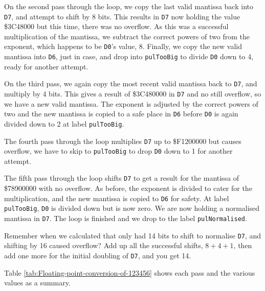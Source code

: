 On the second pass through the loop, we copy the last valid mantissa
back into \texttt{D7}, and attempt to shift by 8 bits. This results
in \texttt{D7} now holding the value \$3C48000 but this time, there
was no overflow. As this was a successful multiplication of the mantissa,
we subtract the correct powers of two from the exponent, which happens
to be \texttt{D0}'s value, 8. Finally, we copy the new valid mantissa
into \texttt{D6}, just in case, and drop into \texttt{pulTooBig} to
divide \texttt{D0} down to 4, ready for another attempt.

On the third pass, we again copy the most recent valid mantissa back
to \texttt{D7}, and multiply by 4 bits. This gives a result of \$3C480000
in \texttt{D7} and no still overflow, so we have a new valid mantissa.
The exponent is adjusted by the correct powers of two and the new
mantissa is copied to a safe place in \texttt{D6} before \texttt{D0}
is again divided down to 2 at label \texttt{pulTooBig}.

The fourth pass through the loop multiplies \texttt{D7} up to \$F1200000
but causes overflow, we have to skip to \texttt{pulTooBig} to drop
\texttt{D0} down to 1 for another attempt.

The fifth pass through the loop shifts \texttt{D7} to get a result
for the mantissa of \$78900000 with no overflow. As before, the exponent
is divided to cater for the multiplication, and the new mantissa is
copied to \texttt{D6} for safety. At label \texttt{pulTooBig}, \texttt{D0}
is divided down but is now zero. We are now holding a normalised mantissa
in \texttt{D7}. The loop is finished and we drop to the label \texttt{pulNormalised}.

Remember when we calculated that only had 14 bits to shift to normalise
\texttt{D7}, and shifting by 16 caused overflow? Add up all the successful
shifts, $8+4+1$, then add one more for the initial doubling of \texttt{D7},
and you get 14.

Table \ref{tab:Floating-point-conversion-of-123456} shows each pass
and the various values as a summary.

